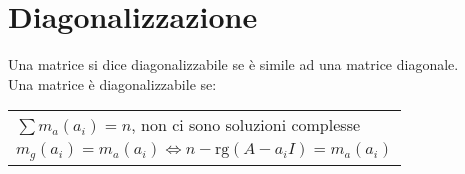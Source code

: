 \section{Diagonalizzazione}
Una matrice si dice diagonalizzabile se è simile ad una matrice diagonale. \\
Una matrice è diagonalizzabile se:

\begin{tabular}{l}
    $\sum m_a(a_i) = n$, non ci sono soluzioni complesse \\
    $m_g(a_i) = m_a(a_i) \Longleftrightarrow  n - \text{rg}(A - a_i I) = m_a(a_i)$ \\
\end{tabular}